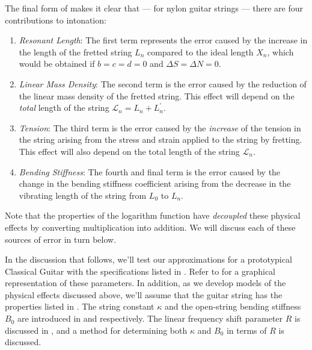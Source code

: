 The final form of  makes it clear that --- for nylon guitar strings --- there are four contributions to intonation:
 \begin{enumerate}
  \item
   \emph{Resonant Length}: The first term represents the error caused by the increase in the length of the fretted string $L_n$ compared to the ideal length $X_n$, which would be obtained if $b = c = d = 0$ and $\Delta S = \Delta N = 0$.
  \item
   \emph{Linear Mass Density}: The second term is the error caused by the reduction of the linear mass density of the fretted string. This effect will depend on the \emph{total} length of the string $\mathcal{L}_n = L_n + L^\prime_n$.
  \item
   \emph{Tension}: The third term is the error caused by the \emph{increase} of the tension in the string arising from the stress and strain applied to the string by fretting. This effect will also depend on the total length of the string $\mathcal{L}_n$.
  \item
   \emph{Bending Stiffness}: The fourth and final term is the error caused by the change in the bending stiffness coefficient arising from the decrease in the vibrating length of the string from $L_0$ to $L_n$.
 \end{enumerate}
Note that the properties of the logarithm function have \emph{decoupled} these physical effects by converting multiplication into addition. We will discuss each of these sources of error in turn below.

In the discussion that follows, we'll test our approximations for a prototypical Classical Guitar with the specifications listed in . Refer to  for a graphical representation of these parameters. In addition, as we develop models of the physical effects discussed above, we'll assume that the guitar string has the properties listed in . The string constant $\kappa$ and the open-string bending stiffness $B_0$ are introduced in  and  respectively. The linear frequency shift parameter $R$ is discussed in , and a method for determining both $\kappa$ and $B_0$ in terms of $R$ is discussed.

